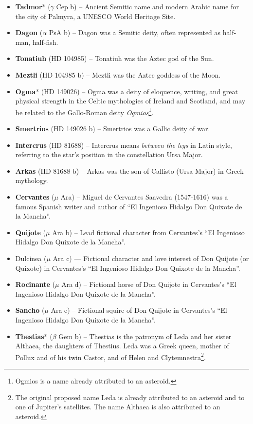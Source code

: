 \begin{itemize}
\item \textbf{Tadmor}* ($\gamma$ Cep b) -- Ancient Semitic name and modern Arabic name for the city of Palmyra, a UNESCO World Heritage Site.
\item \textbf{Dagon} ($\alpha$ PsA b) -- Dagon was a Semitic deity, often represented as half-man, half-fish.
\item \textbf{Tonatiuh} (HD 104985) -- Tonatiuh was the Aztec god of the Sun.
\item \textbf{Meztli} (HD 104985 b) -- Meztli was the Aztec goddess of the Moon.
\item \textbf{Ogma}* (HD 149026) -- Ogma was a deity of eloquence, writing, and great physical strength in the Celtic mythologies of Ireland and Scotland, and may be related to the Gallo-Roman deity \textit{Ogmios}\footnote{Ogmios is a name already attributed to an asteroid.}.
\item \textbf{Smertrios} (HD 149026 b) -- Smertrios was a Gallic deity of war.
\item \textbf{Intercrus} (HD 81688) -- Intercrus means \textit{between the legs} in Latin style, referring to the star's position in the constellation Ursa Major.
\item \textbf{Arkas} (HD 81688 b) -- Arkas was the son of Callisto (Ursa Major) in Greek mythology.
\item \textbf{Cervantes} ($\mu$ Ara) -- Miguel de Cervantes Saavedra (1547-1616) was a famous Spanish writer and author of ``El Ingenioso Hidalgo Don Quixote de la Mancha''.
\item \textbf{Quijote} ($\mu$ Ara b) -- Lead fictional character from Cervantes's ``El Ingenioso Hidalgo Don Quixote de la Mancha''.
\item Dulcinea ($\mu$ Ara c) — Fictional character and love interest of Don Quijote (or Quixote) in Cervantes's ``El Ingenioso Hidalgo Don Quixote de la Mancha''.
\item \textbf{Rocinante} ($\mu$ Ara d) -- Fictional horse of Don Quijote in Cervantes's ``El Ingenioso Hidalgo Don Quixote de la Mancha''.
\item \textbf{Sancho} ($\mu$ Ara e) -- Fictional squire of Don Quijote in Cervantes's ``El Ingenioso Hidalgo Don Quixote de la Mancha''.
\item \textbf{Thestias}* ($\beta$ Gem b) -- Thestias is the patronym of Leda and her sister Althaea, the daughters of Thestius. Leda was a Greek queen, mother of Pollux and of his twin Castor, and of Helen and Clytemnestra\footnote{The original proposed name Leda is already attributed to an asteroid and to one of Jupiter's satellites. The name Althaea is also attributed to an asteroid.}.

\end{itemize}
